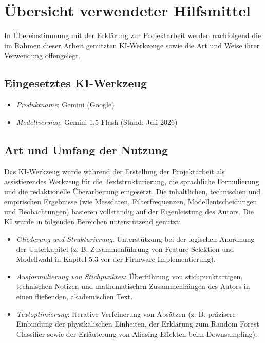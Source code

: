 
\section{Übersicht verwendeter Hilfsmittel}
\label{sec:hilfsmittel}
In Übereinstimmung mit der Erklärung zur Projektarbeit werden nachfolgend die im Rahmen dieser Arbeit genutzten KI-Werkzeuge sowie die Art und Weise ihrer Verwendung offengelegt.

\subsection*{Eingesetztes KI-Werkzeug}
\begin{itemize}
    \item \textit{Produktname}: Gemini (Google)
    \item \textit{Modellversion}: Gemini 1.5 Flash (Stand: Juli 2026)
\end{itemize}

\subsection*{Art und Umfang der Nutzung}
Das KI-Werkzeug wurde während der Erstellung der Projektarbeit als assistierendes Werkzeug für die Textstrukturierung, die sprachliche Formulierung und die redaktionelle Überarbeitung eingesetzt. Die inhaltlichen, technischen und empirischen Ergebnisse (wie Messdaten, Filterfrequenzen, Modellentscheidungen und Beobachtungen) basieren vollständig auf der Eigenleistung des Autors. Die KI wurde in folgenden Bereichen unterstützend genutzt:
\begin{itemize}
    \item \textit{Gliederung und Strukturierung}: Unterstützung bei der logischen Anordnung der Unterkapitel (z. B. Zusammenführung von Feature-Selektion und Modellwahl in Kapitel 5.3 vor der Firmware-Implementierung).
    \item \textit{Ausformulierung von Stichpunkten}: Überführung von stichpunktartigen, technischen Notizen und mathematischen Zusammenhängen des Autors in einen fließenden, akademischen Text.
    \item \textit{Textoptimierung}: Iterative Verfeinerung von Absätzen (z. B. präzisere Einbindung der physikalischen Einheiten, der Erklärung zum Random Forest Classifier sowie der Erläuterung von Aliasing-Effekten beim Downsampling).
\end{itemize}

